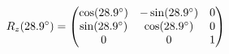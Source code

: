 \documentclass[preview]{standalone}
\begin{document}
\begin{align*}
\special{dvisvgm:raw <g id='unique000'>}R_z(28.9^\circ) = \begin{pmatrix} \cos(28.9^\circ) & -\sin(28.9^\circ) & 0 \\ \sin(28.9^\circ) & \cos(28.9^\circ) & 0 \\ 0 & 0 & 1 \end{pmatrix}\special{dvisvgm:raw </g>}
\end{align*}
\end{document}
